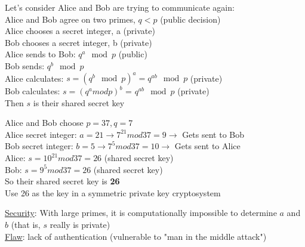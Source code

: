 Let's consider Alice and Bob are trying to communicate again: \\ 
Alice and Bob agree on two primes, $q<p$ (public decision) \\ 
Alice chooses a secret integer, a (private) \\ 
Bob chooses a secret integer, b (private) \\ 
Alice sends to Bob: $q^{a} \mod p$ (public) \\ 
Bob sends: $q^{b} \mod p$ \\ 
Alice calculates: $s=(q^{b} \mod p)^{a}=q^{ab} \mod p$ (private) \\ 
Bob calculates: $s=(q^{a} modp)^{b}$ = $q^{ab} \mod p$ (private) \\
Then $s$ is their shared secret key \\
\begin{example} Alice and Bob choose $p=37, q=7$ \\Alice secret integer: $a=21 \longrightarrow 7^{21} mod37 = 9 \longrightarrow$ Gets sent to Bob \\ Bob secret integer: $b=5 \longrightarrow 7^{5} mod 37 = 10 \longrightarrow$ Gets sent to Alice \\ Alice: 
$s = 10^{21}mod37 = 26$ (shared secret key) \\ Bob: $s = 9^{5}mod37 = 26$ (shared secret key) \\ So their shared secret key is \textbf{26} \\ Use 26 as the key in a symmetric private key cryptosystem \end{example} 

\underline{Security}: With large primes, it is computationally impossible to determine $a$ and $b$ (that is, $s$ really is private) \\

\underline{Flaw}: lack of authentication (vulnerable to "man in the middle attack") \\

